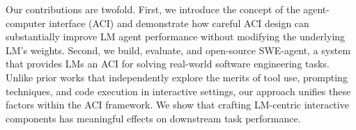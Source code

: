 Our contributions are twofold.
First, we introduce the concept of the agent-computer interface (ACI) and demonstrate how careful ACI design can substantially improve LM agent performance without modifying the underlying LM's weights.
Second, we build, evaluate, and open-source SWE-agent, a system that provides LMs an ACI for solving real-world software engineering tasks.
Unlike prior works that independently explore the merits of tool use, prompting techniques, and code execution in interactive settings, our approach unifies these factors within the ACI framework.
We show that crafting LM-centric interactive components has meaningful effects on downstream task performance.


